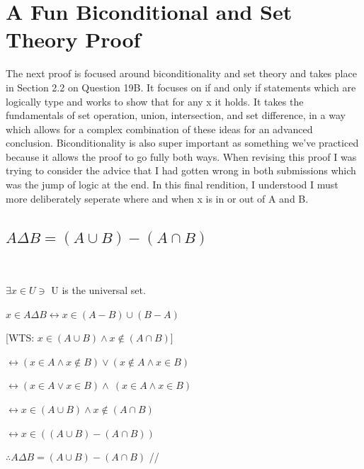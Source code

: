 \documentclass{article}
\begin{document}
\newpage
\section{A Fun Biconditional and Set Theory Proof}
\justifying
The next proof is focused around biconditionality and set theory and takes place in Section 2.2 on Question 19B.  It focuses on if and only if statements which are logically type and works to show that for any x it holds. It takes the fundamentals of set operation, union, intersection, and set difference, in a way which allows for a complex combination of these ideas for an advanced conclusion. Biconditionality is also super important as something we've practiced because it allows the proof to go fully both ways. When revising this proof I was trying to consider the advice that I had gotten wrong in both submissions which was the jump of logic at the end. In this final rendition, I understood I must more deliberately seperate where and when x is in or out of A and B. 
\newpage

\subsection{$A \Delta B = (A \cup B) - (A \cap B)$}
\
\begin{center}
\raggedright
 $\exists x \in U \ni $ U is the universal set.

$x \in A \Delta B \leftrightarrow x \in (A-B) \cup (B-A)$

[WTS: $x \in  (A \cup B) \wedge x \notin (A \cap B)$]

$ \leftrightarrow (x \in A \wedge x \notin B) \vee (x \notin A \wedge x \in B)$ 

$ \leftrightarrow (x \in A \vee x \in B) \wedge ~(x \in A \wedge x \in B)$ 

$\leftrightarrow x \in  (A \cup B) \wedge x \notin (A \cap B)$

$\leftrightarrow x \in  ((A \cup B) - (A \cap B))$

$\therefore  A \Delta B = (A \cup B) - (A \cap B)$  //
\end{center}

\newpage
\end{document}
